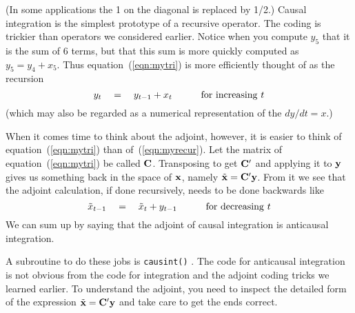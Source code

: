 (In some applications the 1 on the diagonal is replaced by 1/2.)
Causal integration is
the simplest prototype of a recursive operator.
The coding is trickier than operators we considered earlier.
Notice when you compute $y_5$ that it is the sum of 6 terms,
but that this sum is more quickly computed as $y_5 = y_4 + x_5$.
Thus equation~(\ref{eqn:mytri}) is more efficiently thought of as
the recursion
\begin{equation}
y_t \quad = \quad y_{t-1} + x_t
\quad
\quad
\quad {\rm for\ increasing\ } t
\label{eqn:myrecur}
\end{equation}
(which may also be regarded as a numerical representation
of the  $dy/dt=x$.)
\par
When it comes time to think about the adjoint, however,
it is easier to think of equation~(\ref{eqn:mytri}) than of~(\ref{eqn:myrecur}).
Let the matrix of equation~(\ref{eqn:mytri}) be called $\bold C$.
Transposing to get $\bold C '$ and applying it to $\bold y$
gives us something back in the space of $\bold x$,
namely $\tilde{\bold x} = \bold C' \bold y$.
From it we see that the adjoint calculation,
if done recursively,
needs to be done backwards like
\begin{equation}
\tilde x_{t-1} \quad = \quad \tilde x_{t} + y_{t-1}
\quad
\quad
\quad {\rm for\ decreasing\ } t
\label{eqn:backrecur}
\end{equation}
We can sum up by saying that the adjoint of causal integration
is anticausal integration.
\par
A subroutine to do these jobs is \texttt{causint()} .
The code for anticausal integration is not obvious
from the code for integration and the adjoint coding tricks we
learned earlier.
To understand the adjoint, you need to inspect
the detailed form of the expression $\tilde{\bold x} = \bold C' \bold y$
and take care to get the ends correct.
\par


